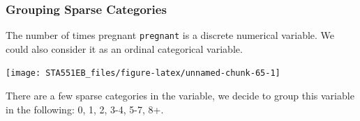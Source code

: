 \documentclass[
]{book}
\newenvironment{Shaded}{\begin{snugshade}}{\end{snugshade}}
\newcommand{\AttributeTok}[1]{\textcolor[rgb]{0.13,0.29,0.53}{#1}}
\newcommand{\FunctionTok}[1]{\textcolor[rgb]{0.13,0.29,0.53}{\textbf{#1}}}
\newcommand{\NormalTok}[1]{#1}
\newcommand{\OtherTok}[1]{\textcolor[rgb]{0.56,0.35,0.01}{#1}}
\newcommand{\SpecialCharTok}[1]{\textcolor[rgb]{0.81,0.36,0.00}{\textbf{#1}}}
\newcommand{\StringTok}[1]{\textcolor[rgb]{0.31,0.60,0.02}{#1}}
\begin{document}
\hfill\break

\hypertarget{grouping-sparse-categories}{%
\subsubsection{Grouping Sparse Categories}\label{grouping-sparse-categories}}

The number of times pregnant \texttt{pregnant} is a discrete numerical variable. We could also consider it as an ordinal categorical variable.

\begin{Shaded}
\end{Shaded}

\begin{center}\texttt{[image: STA551EB\_files/figure-latex/unnamed-chunk-65-1]} \end{center}

There are a few sparse categories in the variable, we decide to group this variable in the following:
0, 1, 2, 3-4, 5-7, 8+.
\end{document}
